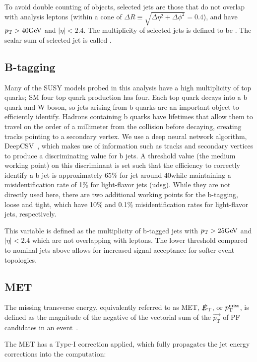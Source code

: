 To avoid double counting of objects,
selected jets are those that do not overlap with analysis leptons 
(within a cone of $\Delta R \equiv \sqrt{\Delta\eta^2 + \Delta\phi^2} = 0.4$),
and have $p_{\mathrm{T}}>40\text{GeV}$ and $|\eta|<2.4$. The multiplicity of selected jets
is defined to be \Njets. The scalar sum of selected jet \pt
is called \HT.

\subsection{B-tagging}
Many of the SUSY models probed in this analysis have a high multiplicity of
top quarks; SM four top quark production has four. Each top quark decays into
a b quark and W boson, so jets arising from b quarks are an important object
to efficiently identify. Hadrons containing b quarks have lifetimes that
allow them to travel on the order of a millimeter from the collision before
decaying, creating tracks pointing to a secondary vertex. We use a deep
neural network algorithm, DeepCSV~\cite{CMS:Sirunyan2017ezt}, which makes use
of information such as tracks and secondary vertices to produce a
discriminating value for b jets. A threshold value (the medium working point)
on this discriminant is set such that the efficiency to correctly identify a
b jet is approximately 65\% for jet \pt around 40\GeV while maintaining a
misidentification rate of 1\% for light-flavor jets (udsg).
While they are not directly used here, there are two additional working points
for the b-tagging, loose and tight, which have 10\% and 0.1\% misidentification 
rates for light-flavor jets, respectively.

This \Nbjets variable is defined as the multiplicity 
of b-tagged jets with $p_{\mathrm{T}}>25\text{GeV}$ and $|\eta|<2.4$ which are
not overlapping with leptons. The lower threshold compared
to nominal jets above allows for increased signal acceptance for softer event
topologies.

\subsection{MET}

The missing transverse energy,
equivalently referred to as MET, $\slashed{E}_\mathrm{T}$, or $p_{\mathrm{T}}^\text{miss}$, is defined
as the magnitude of the negative of the vectorial sum of the $\vec{p_\mathrm{T}}$ of PF candidates in an
event~\cite{CMS:Sirunyan2019kia}.

The MET has a Type-I correction applied, which fully propagates
the jet energy corrections into the computation:

